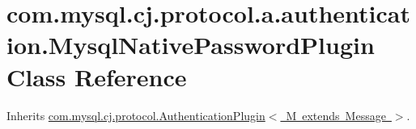 \hypertarget{classcom_1_1mysql_1_1cj_1_1protocol_1_1a_1_1authentication_1_1_mysql_native_password_plugin}{}\section{com.\+mysql.\+cj.\+protocol.\+a.\+authentication.\+Mysql\+Native\+Password\+Plugin Class Reference}
\label{classcom_1_1mysql_1_1cj_1_1protocol_1_1a_1_1authentication_1_1_mysql_native_password_plugin}


Inherits \mbox{\hyperlink{interfacecom_1_1mysql_1_1cj_1_1protocol_1_1_authentication_plugin}{com.\+mysql.\+cj.\+protocol.\+Authentication\+Plugin$<$ M extends Message $>$}}.

